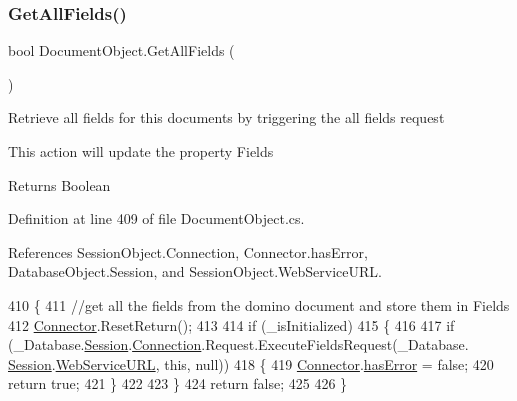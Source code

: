 \subsubsection{\texorpdfstring{Get\+All\+Fields()}{GetAllFields()}}
{\footnotesize\ttfamily bool Document\+Object.\+Get\+All\+Fields (\begin{DoxyParamCaption}{ }\end{DoxyParamCaption})}



Retrieve all fields for this documents by triggering the all fields request 

This action will update the property \textquotesingle{}Fields\textquotesingle{} 

\begin{DoxyReturn}{Returns}
Boolean
\end{DoxyReturn}


Definition at line 409 of file Document\+Object.\+cs.



References Session\+Object.\+Connection, Connector.\+has\+Error, Database\+Object.\+Session, and Session\+Object.\+Web\+Service\+U\+RL.


\begin{DoxyCode}
410     \{
411         \textcolor{comment}{//get all the fields from the domino document and store them in Fields}
412         \mbox{\hyperlink{class_connector}{Connector}}.ResetReturn();
413 
414         \textcolor{keywordflow}{if} (\_isInitialized)
415         \{
416 
417             \textcolor{keywordflow}{if} (\_Database.\mbox{\hyperlink{class_database_object_aa8484162b7d2a7c4c9426bca13c64c07}{Session}}.\mbox{\hyperlink{class_session_object_a014bdbf705a753540e19bfb53030c55c}{Connection}}.Request.ExecuteFieldsRequest(\_Database.
      \mbox{\hyperlink{class_database_object_aa8484162b7d2a7c4c9426bca13c64c07}{Session}}.\mbox{\hyperlink{class_session_object_a697c071c812fbf7ad1166b896fb44c16}{WebServiceURL}}, \textcolor{keyword}{this}, null))
418             \{
419                 \mbox{\hyperlink{class_connector}{Connector}}.\mbox{\hyperlink{class_connector_a079bae21a5417efa53bfe8954c0f533f}{hasError}} = \textcolor{keyword}{false};
420                 \textcolor{keywordflow}{return} \textcolor{keyword}{true};
421             \}
422 
423         \}
424         \textcolor{keywordflow}{return} \textcolor{keyword}{false};
425 
426     \}
\end{DoxyCode}
\mbox{\label{class_document_object_a8883fec3b5b1b6e2e43f4b5ca4092684}} 
